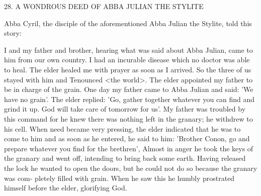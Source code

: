 28.
A WONDROUS DEED OF
ABBA JULIAN THE STYLITE

Abba Cyril, the disciple of the aforementioned Abba Julian the
Stylite, told this story:

I and my father and brother, hearing what was said about Abba
Julian, came to him from our own country.
I had an incurable
disease which no doctor was able to heal.
The elder healed me with
prayer as soon as I arrived.
So the three of us stayed with him and
Tenounced <the world>.
The elder appointed my father to be in
charge of the grain.
One day my father came to Abba Julian and
said: 'We have no grain'.
The elder replied: 'Go, gather together
whatever you can find and grind it up.
God will take care of
tomorrow for us'.
My father was troubled by this command for he
knew there was nothing left in the granary; he withdrew to his cell.
When need became very pressing, the elder indicated that he was to
come to him and as soon as he entered, he said to him: 'Brother
Conon, go and prepare whatever you find for the brethren', Almost
in anger he took the keys of the granary and went off, intending to
bring back some earth.
Having released the lock he wanted to open
the doors, but he could not do so because the granary was com-
pletely filled with grain.
When he saw this he humbly prostrated
himself before the elder, glorifying God.

